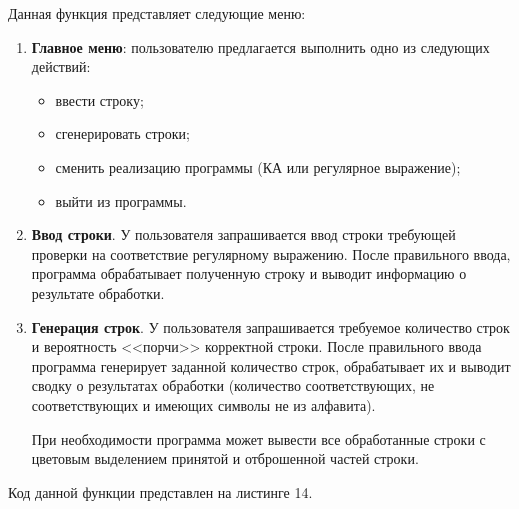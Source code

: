 \documentclass[a4paper,final]{article}
\begin{document}
Данная функция представляет следующие меню:
\begin{enumerate}
    \item \textbf{Главное меню}: пользователю предлагается выполнить одно из следующих действий:
    \begin{itemize}
        \item ввести строку;
        \item сгенерировать строки;
        \item сменить реализацию программы (КА или регулярное выражение);
        \item выйти из программы.
    \end{itemize}
    \item \textbf{Ввод строки}. У пользователя запрашивается ввод строки требующей проверки на соответствие регулярному выражению. После правильного ввода, программа обрабатывает полученную строку и выводит информацию о результате обработки.
    \item \textbf{Генерация строк}. У пользователя запрашивается требуемое количество строк и вероятность <<порчи>> корректной строки. После правильного ввода программа генерирует заданной количество строк, обрабатывает их и выводит сводку о результатах обработки (количество соответствующих, не соответствующих и имеющих символы не из алфавита). 
    
    При необходимости программа может вывести все обработанные строки с цветовым выделением принятой и отброшенной частей строки.
\end{enumerate}

Код данной функции представлен на листинге 14.
\end{document}
